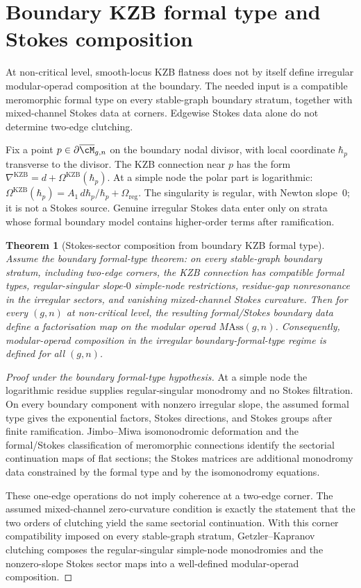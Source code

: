 \documentclass[11pt]{amsart}
\newtheorem{theorem}{Theorem}[section]
\theoremstyle{definition}
\theoremstyle{remark}
\begin{document}
\section{Boundary KZB formal type and Stokes composition}
\label{sec:jimbo-miwa-standalone}

At non-critical level, smooth-locus KZB flatness does not by itself
define irregular modular-operad composition at the boundary. The needed
input is a compatible meromorphic formal type on every stable-graph
boundary stratum, together with mixed-channel Stokes data at corners.
Edgewise Stokes data alone do not determine two-edge clutching.

Fix a point $p \in \partial\overline{\cM}_{g, n}$ on the boundary
nodal divisor, with local coordinate $\hbar_p$ transverse to the
divisor. The KZB connection near $p$ has the form
$\nabla^{\mathrm{KZB}} = d + \Omega^{\mathrm{KZB}}(\hbar_p)$. At a
simple node the polar part is logarithmic:
$\Omega^{\mathrm{KZB}}(\hbar_p)=A_1\,d\hbar_p/\hbar_p+
\Omega_{\mathrm{reg}}$. The singularity is regular, with Newton
slope~$0$; it is not a Stokes source. Genuine irregular Stokes data
enter only on strata whose formal boundary model contains higher-order
terms after ramification.

\begin{theorem}[Stokes-sector composition from boundary KZB formal type]%
\label{thm:irregular-singular-kzb-regularity-standalone}%
Assume the boundary formal-type theorem: on every stable-graph
boundary stratum, including two-edge corners, the KZB connection has
compatible formal types, regular-singular slope-$0$ simple-node
restrictions, residue-gap nonresonance in the irregular sectors, and
vanishing mixed-channel Stokes curvature. Then for every $(g,n)$ at
non-critical level, the resulting formal/Stokes boundary data define a
factorisation map on the modular operad $M\mathrm{Ass}(g,n)$.
Consequently, modular-operad composition in the irregular
boundary-formal-type regime is defined for all $(g,n)$.
\end{theorem}

\begin{proof}[Proof under the boundary formal-type hypothesis]
At a simple node the logarithmic residue supplies regular-singular
monodromy and no Stokes filtration. On every boundary component with
nonzero irregular slope, the assumed formal type gives the exponential
factors, Stokes directions, and Stokes groups after finite
ramification. Jimbo--Miwa isomonodromic deformation and the
formal/Stokes classification of meromorphic connections identify the
sectorial continuation maps of flat sections; the Stokes matrices are
additional monodromy data constrained by the formal type and by the
isomonodromy equations.

These one-edge operations do not imply coherence at a two-edge corner.
The assumed mixed-channel zero-curvature condition is exactly the
statement that the two orders of clutching yield the same sectorial
continuation. With this corner compatibility imposed on every
stable-graph stratum, Getzler--Kapranov clutching composes the
regular-singular simple-node monodromies and the nonzero-slope Stokes
sector maps into a well-defined modular-operad composition.
\end{proof}
\end{document}
